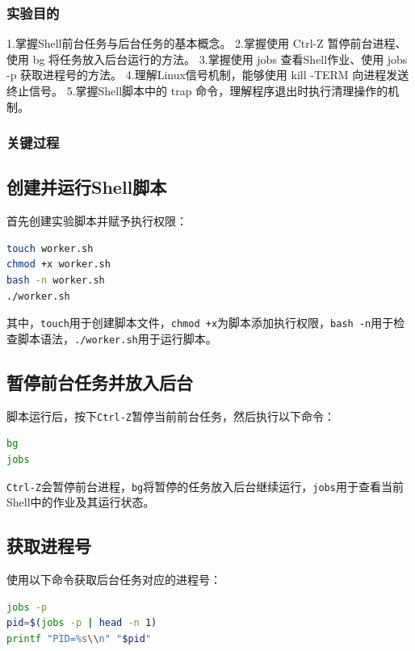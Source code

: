 \documentclass[UTF8,12pt,a4paper]{ctexart}
\begin{document}
\subsubsection{实验目的}

1.掌握Shell前台任务与后台任务的基本概念。
2.掌握使用 Ctrl-Z 暂停前台进程、使用 bg 将任务放入后台运行的方法。
3.掌握使用 jobs 查看Shell作业、使用 jobs -p 获取进程号的方法。
4.理解Linux信号机制，能够使用 kill -TERM 向进程发送终止信号。
5.掌握Shell脚本中的 trap 命令，理解程序退出时执行清理操作的机制。

\subsubsection{关键过程}

\subsection{创建并运行Shell脚本}

首先创建实验脚本并赋予执行权限：

\begin{lstlisting}[language=bash]
touch worker.sh
chmod +x worker.sh
bash -n worker.sh
./worker.sh
\end{lstlisting}

其中，\texttt{touch}用于创建脚本文件，\texttt{chmod +x}为脚本添加执行权限，\texttt{bash -n}用于检查脚本语法，\texttt{./worker.sh}用于运行脚本。

\subsection{暂停前台任务并放入后台}

脚本运行后，按下\texttt{Ctrl-Z}暂停当前前台任务，然后执行以下命令：

\begin{lstlisting}[language=bash]
bg
jobs
\end{lstlisting}

\texttt{Ctrl-Z}会暂停前台进程，\texttt{bg}将暂停的任务放入后台继续运行，\texttt{jobs}用于查看当前Shell中的作业及其运行状态。

\subsection{获取进程号}

使用以下命令获取后台任务对应的进程号：

\begin{lstlisting}[language=bash]
jobs -p
pid=$(jobs -p | head -n 1)
printf "PID=%s\\n" "$pid"
\end{lstlisting}
\end{document}
